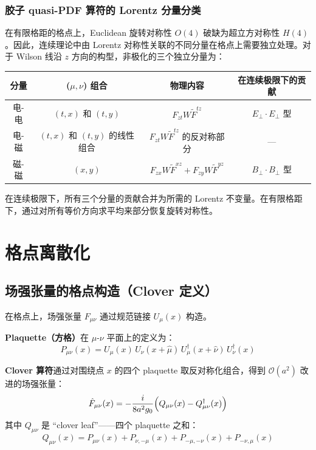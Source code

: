 \documentclass[11pt,a4paper]{ctexart}
\newcommand{\Fmunu}{F_{\mu\nu}}
\newcommand{\order}[1]{\mathcal{O}(#1)}
\begin{document}
\subsubsection{胶子 quasi-PDF 算符的 Lorentz 分量分类}

在有限格距的格点上，Euclidean 旋转对称性 $O(4)$ 破缺为超立方对称性 $H(4)$。因此，连续理论中由 Lorentz 对称性关联的不同分量在格点上需要独立处理。对于 Wilson 线沿 $z$ 方向的构型，非极化的三个独立分量为：

\begin{center}
\begin{tabular}{c c c c}
\toprule
\textbf{分量} & \textbf{($\mu,\nu$) 组合} & \textbf{物理内容} & \textbf{在连续极限下的贡献} \\
\midrule
电-电 & $(t, x)$ 和 $(t, y)$ & $F_{zt} W \tilde{F}^{tz}$ & $E_\perp \cdot E_\perp$ 型 \\
电-磁 & $(t, x)$ 和 $(t, y)$ 的线性组合 & $F_{zt} W \tilde{F}^{tz}$ 的反对称部分 & --- \\
磁-磁 & $(x, y)$ & $F_{zx} W \tilde{F}^{xz} + F_{zy} W \tilde{F}^{yz}$ & $B_\perp \cdot B_\perp$ 型 \\
\bottomrule
\end{tabular}
\end{center}

在连续极限下，所有三个分量的贡献合并为所需的 Lorentz 不变量。在有限格距下，通过对所有等价方向求平均来部分恢复旋转对称性。

\section{格点离散化}

\subsection{场强张量的格点构造（Clover 定义）}

在格点上，场强张量 $\Fmunu$ 通过规范链接 $U_\mu(x)$ 构造。

\textbf{Plaquette（方格）}在 $\mu$-$\nu$ 平面上的定义为：
\begin{equation}
P_{\mu\nu}(x) = U_\mu(x)\,U_\nu(x+\hat{\mu})\,U_\mu^{\dagger}(x+\hat{\nu})\,U_\nu^{\dagger}(x)
\end{equation}

\textbf{Clover 算符}通过对围绕点 $x$ 的四个 plaquette 取反对称化组合，得到 $\order{a^2}$ 改进的场强张量：
\begin{equation}\label{eq:clover_F}
\hat{F}_{\mu\nu}(x) = -\frac{i}{8a^{2}g_{0}}
\Bigl( Q_{\mu\nu}(x) - Q_{\mu\nu}^{\dagger}(x) \Bigr)
\end{equation}
其中 $Q_{\mu\nu}$ 是 ``clover leaf''——四个 plaquette 之和：
\begin{equation}
Q_{\mu\nu}(x) = P_{\mu\nu}(x) + P_{\nu,-\mu}(x) + P_{-\mu,-\nu}(x) + P_{-\nu,\mu}(x)
\end{equation}
\end{document}
